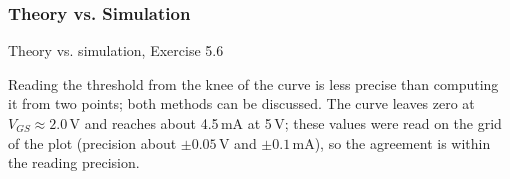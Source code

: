 \subsubsection*{Theory vs. Simulation}
\begin{comparison}{Theory vs. simulation, Exercise 5.6}
\end{comparison}
\begin{solution}
Reading the threshold from the knee of the curve is less precise than computing it from two points; both methods can be
discussed. The curve leaves zero at $V_{GS} \approx 2.0$\,V and reaches about 4.5\,mA at 5\,V; these values were read on the
grid of the plot (precision about $\pm0.05$\,V and $\pm0.1$\,mA), so the agreement is within the reading precision.
\end{solution}
